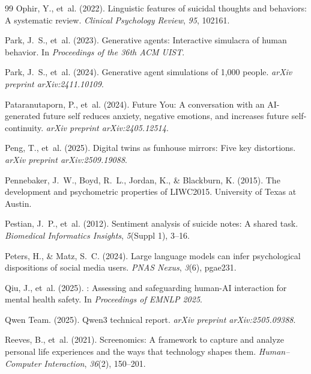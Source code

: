 \documentclass[review,12pt,authoryear]{elsarticle}
\begin{document}
\begin{thebibliography}{99}
Ophir, Y., et~al. (2022).
\newblock Linguistic features of suicidal thoughts and behaviors: {A} systematic review.
\newblock \textit{Clinical Psychology Review}, \textit{95}, 102161.

Park, J.~S., et~al. (2023).
\newblock Generative agents: {I}nteractive simulacra of human behavior.
\newblock In \textit{Proceedings of the 36th ACM UIST}.

Park, J.~S., et~al. (2024).
\newblock Generative agent simulations of 1,000 people.
\newblock \textit{arXiv preprint arXiv:2411.10109}.

Pataranutaporn, P., et~al. (2024).
\newblock Future {Y}ou: {A} conversation with an {AI}-generated future self reduces anxiety, negative emotions, and increases future self-continuity.
\newblock \textit{arXiv preprint arXiv:2405.12514}.

Peng, T., et~al. (2025).
\newblock Digital twins as funhouse mirrors: {F}ive key distortions.
\newblock \textit{arXiv preprint arXiv:2509.19088}.

Pennebaker, J.~W., Boyd, R.~L., Jordan, K., \& Blackburn, K. (2015).
\newblock The development and psychometric properties of {LIWC2015}.
\newblock University of Texas at Austin.

Pestian, J.~P., et~al. (2012).
\newblock Sentiment analysis of suicide notes: {A} shared task.
\newblock \textit{Biomedical Informatics Insights}, \textit{5}(Suppl 1), 3--16.

Peters, H., \& Matz, S.~C. (2024).
\newblock Large language models can infer psychological dispositions of social media users.
\newblock \textit{PNAS Nexus}, \textit{3}(6), pgae231.

Qiu, J., et~al. (2025).
: {A}ssessing and safeguarding human-{AI} interaction for mental health safety.
\newblock In \textit{Proceedings of EMNLP 2025}.

Qwen Team. (2025).
\newblock Qwen3 technical report.
\newblock \textit{arXiv preprint arXiv:2505.09388}.

Reeves, B., et~al. (2021).
\newblock Screenomics: {A} framework to capture and analyze personal life experiences and the ways that technology shapes them.
\newblock \textit{Human--Computer Interaction}, \textit{36}(2), 150--201.


\end{thebibliography}
\end{document}
